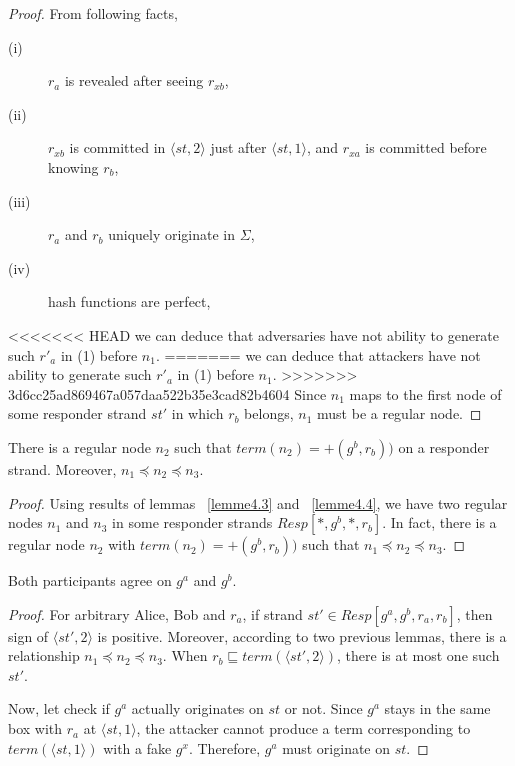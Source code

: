 \begin{itemize}
\begin{proof}
From following facts,
\begin{description} 
 \item [(i)] $r_a$ is revealed after seeing $r_{xb}$, 
 \item [(ii)] $r_{xb}$ is committed in $\langle st,2 \rangle$ just after $\langle st,1 \rangle$, and $r_{xa}$ is committed before knowing $r_b$, 
 \item[(iii)] $r_a$ and $r_b$ uniquely originate in $\Sigma$, 
 \item [(iv)] hash functions are perfect,
\end{description}
<<<<<<< HEAD
we can deduce that adversaries have not ability to generate such $r'_{a}$ in (1) before $n_1$. 
=======
we can deduce that attackers have not ability to generate such $r'_{a}$ in (1) before $n_1$. 
>>>>>>> 3d6cc25ad869467a057daa522b35e3cad82b4604
Since $n_1$ maps to the first node of some responder strand $st'$ in which $r_b$ belongs, $n_1$ must be a regular node. 
\end{proof}

\begin{Lemma}\label{lemme4.5}
There is a regular node $n_2$ such that $term(n_2)= + (g^b,r_b))$ on a responder strand. Moreover, $n_1 \preceq n_2 \preceq n_3$.
\end{Lemma}

\begin{proof}
Using results of lemmas ~\ref{lemme4.3} and ~\ref{lemme4.4}, we have two regular nodes $n_1$ and $n_3$ in some responder strands $Resp[*,g^b,*,r_b]$. In fact, there is a regular node $n_2$ with $term(n_2)= + (g^b,r_b))$ such that $n_1 \preceq n_2 \preceq n_3$. 
\end{proof}

\begin{Lemma}\label{lemme4.6}
Both participants agree on $g^a$ and $g^b$. 
\end{Lemma}

\begin{proof}
For arbitrary Alice, Bob and $r_a$, if strand $st' \in Resp[g^a,g^b,r_a,r_b]$, then sign of $\langle st',2 \rangle$ is positive. Moreover, according to two previous lemmas, there is a relationship $n_1 \preceq n_2 \preceq n_3$. When $r_b \sqsubseteq term(\langle st',2 \rangle )$, there is at most one such $st'$.

Now, let check if $g^a$ actually originates on $st$ or not. Since $g^a$ stays in the same box with $r_a$ at $\langle st,1 \rangle$, the attacker cannot produce a term corresponding to $term(\langle st,1 \rangle )$ with a fake $g^{x}$. Therefore, $g^a$ must originate on $st$. 


\end{proof}
\end{itemize}
